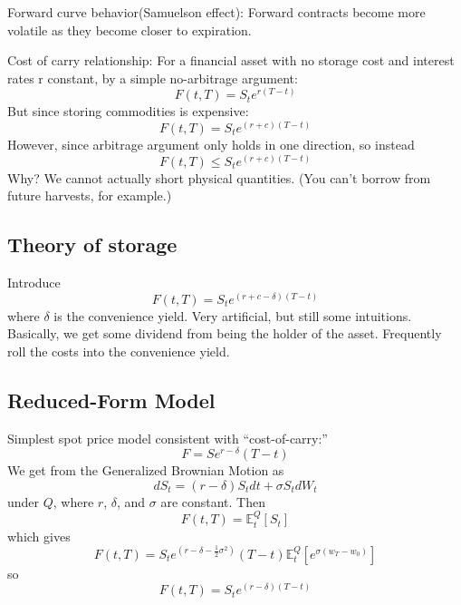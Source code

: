 \documentclass[twocolumn,openany]{book}
\begin{document}
Forward curve behavior(Samuelson effect): Forward contracts become more volatile as they become closer to expiration.

Cost of carry relationship:
For a financial asset with no storage cost and interest rates r constant, by a simple no-arbitrage argument:
\begin{equation}
	F(t,T) = S_t e^{r(T-t)}
\end{equation}
But since storing commodities is expensive:
\begin{equation}
	F(t,T) = S_t e^{(r+c)(T-t)}
\end{equation}
However, since arbitrage argument only holds in one direction, so instead
\begin{equation}
	F(t,T) \leq S_t e^{(r+c)(T-t)}
\end{equation}
Why? We cannot actually short physical quantities. (You can't borrow from future harvests, for example.)

\subsection{Theory of storage}
Introduce
\begin{equation}
	F(t,T) = S_t e^{(r+c-\delta)(T-t)}
\end{equation}
where $\delta$ is the convenience yield. Very artificial, but still some intuitions. Basically, we get some dividend from being the holder of the asset. Frequently roll the costs into the convenience yield.

\subsection{Reduced-Form Model}
Simplest spot price model consistent with ``cost-of-carry:''
\begin{equation}
	F = S e^{r-\delta}(T-t)
\end{equation}
We get from the Generalized Brownian Motion as
\begin{equation}
	dS_t = (r-\delta)S_t dt + \sigma S_t dW_t
\end{equation}
under $Q$, where $r$, $\delta$, and $\sigma$ are constant. Then
\begin{equation}
	F(t,T) = \mathbb{E}_t^Q\left[ S_t \right]
\end{equation}
which gives
\begin{equation}
	F(t,T ) = S_t e^(r-\delta - \frac12 \sigma^2)(T-t)\mathbb{E}_t^Q\left[ e^{\sigma(w_T-w_0)} \right]
\end{equation}
so 
\begin{equation}
	F(t,T) = S_t e^{(r-\delta)(T-t)}
\end{equation}
\end{document}
